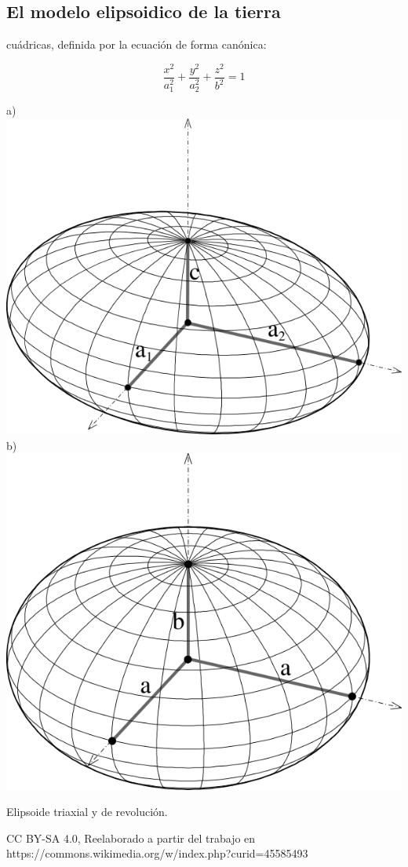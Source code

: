 \documentclass{tufte-book}
\begin{document}
\subsection{El modelo elipsoidico de la tierra}

 cuádricas, definida por la ecuación de forma canónica:

\begin{equation*}
\frac{x^2}{a_1^2}+\frac{y^2}{a_2^2}+\frac{z^2}{b^2}=1
\end{equation*}

\begin{marginfigure}
  \label{fig:sistemas}
  a)
  \includegraphics{./imgs/triaxial.png}
  b)
  \includegraphics{./imgs/elipsoide.png}
  \caption{Elipsoide triaxial y de revolución.}
  \scriptsize CC BY-SA 4.0, Reelaborado a partir del trabajo en https://commons.wikimedia.org/w/index.php?curid=45585493
\end{marginfigure}
 
\end{document}
